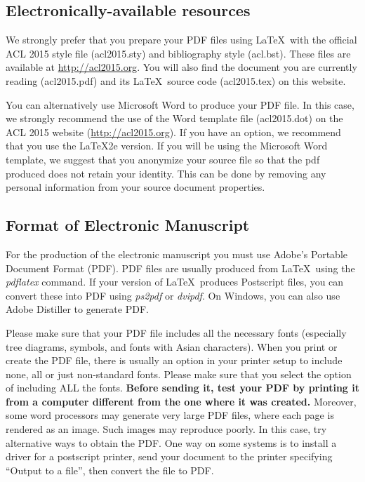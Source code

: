 \documentclass[9pt]{article}
\begin{document}
\subsection{Electronically-available resources}

We strongly prefer that you prepare your PDF files using \LaTeX\ with
the official ACL 2015 style file (acl2015.sty) and bibliography style
(acl.bst). These files are available at
\url{http://acl2015.org}. You will also find the document
you are currently reading (acl2015.pdf) and its \LaTeX\ source code
(acl2015.tex) on this website.

You can alternatively use Microsoft Word to produce your PDF file. In
this case, we strongly recommend the use of the Word template file
(acl2015.dot) on the ACL 2015 website (\url{http://acl2015.org}). 
If you have an option, we recommend that you use the \LaTeX2e version. 
If you will be using the Microsoft Word template, we suggest that you 
anonymize your source file so that the pdf produced does not retain your
identity.  This can be done by removing any personal information
from your source document properties.



\subsection{Format of Electronic Manuscript}
\label{sect:pdf}

For the production of the electronic manuscript you must use Adobe's
Portable Document Format (PDF). PDF files are usually produced from
\LaTeX\ using the \textit{pdflatex} command. If your version of
\LaTeX\ produces Postscript files, you can convert these into PDF
using \textit{ps2pdf} or \textit{dvipdf}. On Windows, you can also use
Adobe Distiller to generate PDF.

Please make sure that your PDF file includes all the necessary fonts
(especially tree diagrams, symbols, and fonts with Asian
characters). When you print or create the PDF file, there is usually
an option in your printer setup to include none, all or just
non-standard fonts.  Please make sure that you select the option of
including ALL the fonts. \textbf{Before sending it, test your PDF by
  printing it from a computer different from the one where it was
  created.} Moreover, some word processors may generate very large PDF
files, where each page is rendered as an image. Such images may
reproduce poorly. In this case, try alternative ways to obtain the
PDF. One way on some systems is to install a driver for a postscript
printer, send your document to the printer specifying ``Output to a
file'', then convert the file to PDF.
\end{document}
